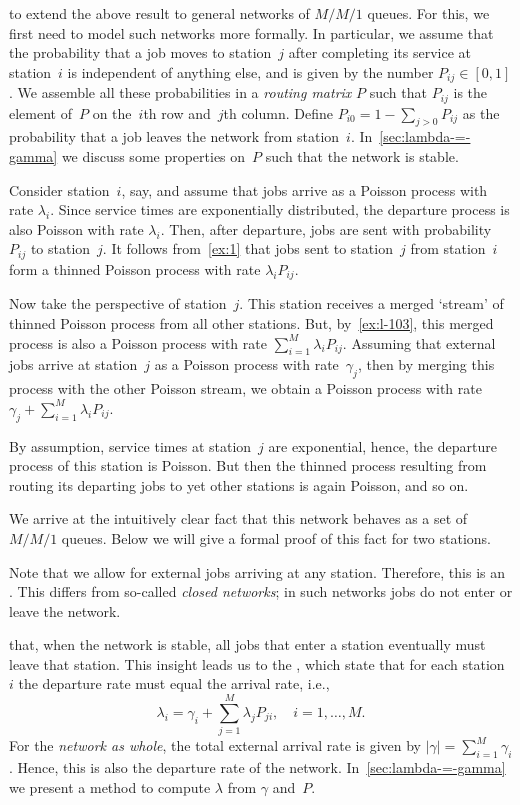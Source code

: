 \documentclass[stochastic-or.tex]{subfiles}
\begin{document}
 to extend the above result to general networks of $M/M/1$ queues.
For this, we first need to model such networks more formally.
In particular, we assume that the probability that a job moves to station~$j$ after completing its service at station~$i$ is independent of anything else, and is given by the number $P_{i j}\in[0,1]$.
We assemble all these probabilities in a \emph{routing matrix} $P$ such that $P_{i j}$ is the element of~$P$ on the~$i$th row and~$j$th column.
Define $P_{i0} = 1-\sum_{j>0}P_{ij}$ as the probability that a job leaves the network from station~$i$.
In~\cref{sec:lambda-=-gamma} we discuss some properties on~$P$ such that the  network is stable.

Consider station~$i$, say, and assume that jobs arrive as a Poisson process with rate $\lambda_i$.
Since service times are exponentially distributed, the departure process is also Poisson with rate $\lambda_i$.
Then, after departure, jobs are sent with probability $P_{i j}$ to station~$j$.
It follows from~\cref{ex:1} that jobs sent to station~$j$ from station~$i$ form a thinned Poisson process with rate $\lambda_i P_{i j}$.

Now take the perspective of station~$j$.
This station receives a merged `stream' of thinned Poisson process from all other stations.
But, by~\cref{ex:l-103}, this merged process is also a Poisson process with rate $\sum_{i=1}^{M}\lambda_i P_{ij}$.
Assuming that external jobs arrive at station~$j$ as a Poisson process with rate~$\gamma_j$, then by
merging this process with the other Poisson stream, we obtain a Poisson process with rate $\gamma_j + \sum_{i=1}^M \lambda_i P_{i j}$.

By assumption, service times at station~$j$ are exponential, hence, the departure process of this station is Poisson.
But then the thinned process resulting from routing its departing jobs to yet other stations is again Poisson, and so on.

We arrive at the intuitively clear fact that this network behaves as a set of $M/M/1$ queues. Below we will give a formal proof of this fact for two stations.


Note that we allow for external jobs arriving at any station.
Therefore, this is an .
This differs from so-called \emph{closed networks}; in such networks jobs do not enter or leave the network.

 that, when the network is stable, all jobs that enter a station eventually must leave that station.
This insight leads us to the , which state that for each station~$i$ the departure rate must equal the arrival rate, i.e.,
\begin{equation}\label{eq:101}
  \lambda_i = \gamma_i + \sum_{j=1}^M \lambda_j P_{j i}, \quad i = 1, \ldots, M.
\end{equation}
For the \emph{network as whole}, the total external arrival rate is given by $|\gamma|= \sum_{i=1}^M \gamma_i$.
Hence, this is also the departure rate of the network. In~\cref{sec:lambda-=-gamma} we present a method to compute $\lambda$ from $\gamma$ and~$P$.
\end{document}
